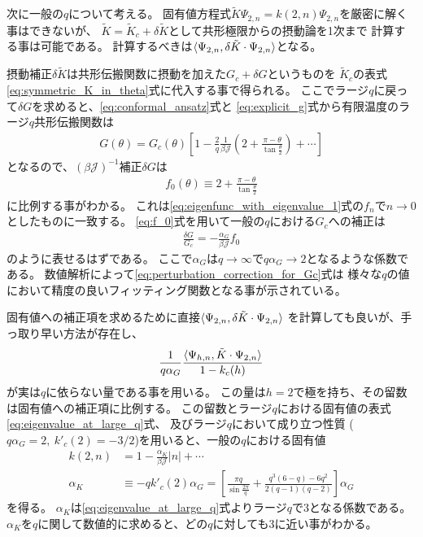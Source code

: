 次に一般の$q$について考える。
固有値方程式$\tilde{K} \Psi_{2,n} = k(2, n)\Psi_{2,n}$を厳密に解く事はできないが、
$\tilde{K} = \tilde{K}_c + \delta\tilde{K}$として共形極限からの摂動論を1次まで
計算する事は可能である。
計算するべきは$\langle \Psi_{2,n}, \delta\tilde{K}\cdot\Psi_{2,n} \rangle$となる。

摂動補正$\delta\tilde{K}$は共形伝搬関数に摂動を加えた$G_c + \delta G$というものを
$\tilde{K}_c$の表式\eqref{eq:symmetric_K_in_theta}式に代入する事で得られる。
ここでラージ$q$に戻って$\delta G$を求めると、\eqref{eq:conformal_ansatz}式と
\eqref{eq:explicit_g}式から有限温度のラージ$q$共形伝搬関数は
\begin{align}
	G(\theta) = G_c(\theta)\left[
		1 - \frac{2}{q}\frac{1}{\beta\mathcal{J}}
		\left(2 + \frac{\pi - \theta}{\tan\frac{\theta}{2}}\right) + \cdots
	\right]
\end{align}
となるので、$(\beta\mathcal{J})^{-1}$補正$\delta G$は
\begin{align}
	f_0(\theta) \equiv 2 + \frac{\pi - \theta}{\tan\frac{\theta}{2}}
	\label{eq:f_0}
\end{align}
に比例する事がわかる。
これは\eqref{eq:eigenfunc_with_eigenvalue_1}式の$f_n$で$n\to 0$としたものに一致する。
\eqref{eq:f_0}式を用いて一般の$q$における$G_c$への補正は
\begin{align}
	\frac{\delta G}{G_c} = -\frac{\alpha_G}{\beta\mathcal{J}}f_0
	\label{eq:perturbation_correction_for_Gc}
\end{align}
のように表せるはずである。
ここで$\alpha_G$は$q\to\infty$で$q\alpha_G\to 2$となるような係数である。
数値解析によって\eqref{eq:perturbation_correction_for_Gc}式は
様々な$q$の値において精度の良いフィッティング関数となる事が示されている\cite{maldacena}。

固有値への補正項を求めるために直接$\langle \Psi_{2,n}, \delta\tilde{K}\cdot\Psi_{2,n} \rangle$
を計算しても良いが、手っ取り早い方法が存在し、
\begin{align}
	\frac{1}{q\alpha_G}\frac{\langle \Psi_{h,n}, \tilde{K}\cdot\Psi_{2,n} \rangle}{1-k_c(h)}
\end{align}
が実は$q$に依らない量である事を用いる\cite{maldacena}。
この量は$h=2$で極を持ち、その留数は固有値への補正項に比例する。
この留数とラージ$q$における固有値の表式\eqref{eq:eigenvalue_at_large_q}式、
及びラージ$q$において成り立つ性質
($q\alpha_G = 2,\ k'_c(2) = -3/2$)を用いると、一般の$q$における固有値
\begin{align}
	k(2, n) &= 1 - \frac{\alpha_K}{\beta\mathcal{J}}|n| + \cdots\\
	\alpha_K &\equiv -qk'_c(2)\alpha_G
		= \left[
			\frac{\pi q}{\sin\frac{2\pi}{q}} + \frac{q^3(6-q) - 6q^2}{2(q-1)(q-2)}
		\right]\alpha_G
	\label{eq:corrected_eigenvalue}
\end{align}
を得る。
$\alpha_K$は\eqref{eq:eigenvalue_at_large_q}式よりラージ$q$で3となる係数である。
$\alpha_K$を$q$に関して数値的に求めると、どの$q$に対しても3に近い事がわかる\cite{maldacena}。

